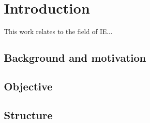 \section{Introduction}

This work relates to the field of \gls{IE}...

\subsection{Background and motivation}

\subsection{Objective}

\subsection{Structure}
